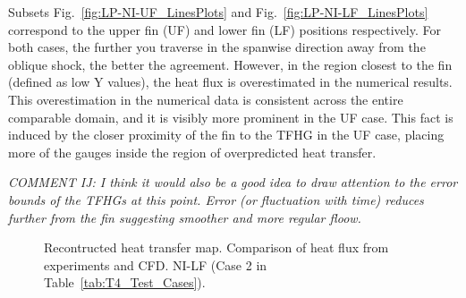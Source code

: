 \documentclass{AIAA}
\begin{document}
Subsets Fig.~\ref{fig:LP-NI-UF_LinesPlots} and Fig.~\ref{fig:LP-NI-LF_LinesPlots} correspond to the upper fin (UF) and lower fin (LF) positions respectively.
For both cases, the further you traverse in the spanwise direction away from the oblique shock, the better the agreement.
However, in the region closest to the fin (defined as low Y values), the heat flux is overestimated in the numerical results.
This overestimation in the numerical data is consistent across the entire comparable domain, and it is visibly more prominent in the UF case.
This fact is induced by the closer proximity of the fin to the TFHG in the UF case, placing more of the gauges inside the region of overpredicted heat transfer. 

{\it COMMENT IJ: I think it would also be a good idea to draw attention to the error bounds of the TFHGs at this point. Error (or fluctuation with time) reduces further from the fin suggesting smoother and more regular floow.}

\begin{figure}[!h]
\center
\begin{adjustbox}{max width=1.1\columnwidth,center}
%
\end{adjustbox}
\caption{Recontructed heat transfer map. Comparison of heat flux from experiments and CFD. NI-LF (Case 2 in Table~\ref{tab:T4_Test_Cases}).}
\label{fig:HeatFluxNILF}
\end{figure} 
\end{document}
